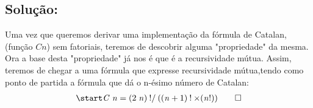 \documentclass[a4paper]{article}
\newcommand{\Conid}[1]{\mathit{#1}}
\newcommand{\Varid}[1]{\mathit{#1}}
\begin{document}
\subsection*{Solução:}
Uma vez que queremos derivar uma implementação da fórmula de Catalan, (função \ensuremath{\Conid{Cn}}) sem fatoriais, teremos de descobrir alguma "propriedade" da mesma. Ora a base desta "propriedade" já nos é que é a recursividade mútua. Assim, teremos de chegar a uma fórmula que expresse recursividade mútua,tendo como ponto de partida a fórmula que dá o n-ésimo número de Catalan:
\begin{eqnarray*}
\start
\ensuremath{\Conid{C}\;\Varid{n}\mathrel{=}(\mathrm{2}\;\Varid{n})\mathbin{!/}((\Varid{n}\mathbin{+}\mathrm{1})\mathbin{!}\times(\Varid{n}\mathbin{!}))}
%
\qed
\end{eqnarray*}
\end{document}
